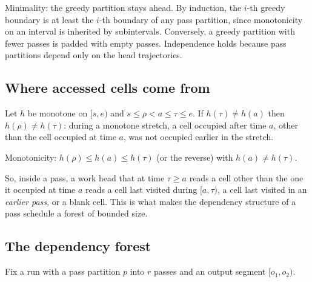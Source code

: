 \begin{outline}
Minimality: the greedy partition stays ahead. By induction, the $i$-th greedy boundary is at least
the $i$-th boundary of any pass partition, since monotonicity on an interval is inherited by
subintervals. Conversely, a greedy partition with fewer passes is padded with empty passes. Independence
holds because pass partitions depend only on the head trajectories.
\end{outline}

\subsection{Where accessed cells come from}

\begin{lemma}\label{lem:fresh}
Let $h$ be monotone on $[s,e)$ and $s\le\rho<a\le\tau\le e$. If $h(\tau)\ne h(a)$ then
$h(\rho)\ne h(\tau)$: during a monotone stretch, a cell occupied after time $a$, other than the
cell occupied at time $a$, was not occupied earlier in the stretch.
\end{lemma}

\begin{outline}
Monotonicity: $h(\rho)\le h(a)\le h(\tau)$ (or the reverse) with $h(a)\ne h(\tau)$.
\end{outline}

So, inside a pass, a work head that at time $\tau\ge a$ reads a cell other than the one it occupied at
time $a$ reads a cell last visited during $[a,\tau)$, a cell last visited in an \emph{earlier pass}, or a
blank cell. This is what makes the dependency structure of a pass schedule a forest of bounded size.

\subsection{The dependency forest}

Fix a run with a pass partition $p$ into $r$ passes and an output segment $[o_1,o_2)$.

